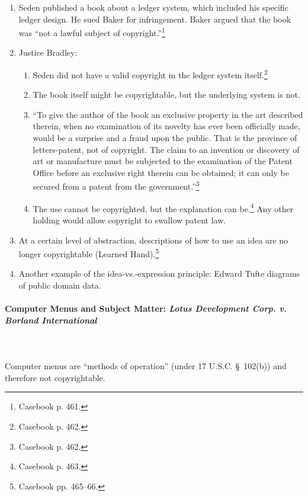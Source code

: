 \begin{enumerate}
    \item Seden published a book about a ledger system, which included his 
    specific ledger design. He sued Baker for infringement. Baker argued that 
    the book was ``not a lawful subject of copyright.''\footnote{Casebook p. 
    461.}
    \item Justice Bradley:
    \begin{enumerate}
        \item Seden did not have a valid copyright in the ledger system 
        itself.\footnote{Casebook p. 462.}
        \item The book itself might be copyrightable, but the underlying 
        system is not.
        \item ``To give the author of the book an exclusive property in the 
        art described therein, when no examination of its novelty has ever 
        been officially made, would be a surprise and a fraud upon the public. 
        That is the province of letters-patent, not of copyright. The claim to 
        an invention or discovery of art or manufacture must be subjected to 
        the examination of the Patent Office before an exclusive right therein 
        can be obtained; it can only be secured from a patent from the 
        government.''\footnote{Casebook p. 462.}
        \item The use cannot be copyrighted, but the explanation can 
        be.\footnote{Casebook p. 463.} Any other holding would allow copyright 
        to swallow patent law.
    \end{enumerate}
    \item At a certain level of abstraction, descriptions of how to use an 
    idea are no longer copyrightable (Learned Hand).\footnote{Casebook pp. 
    465--66.}
    \item Another example of the idea-vs.-expression principle: Edward Tufte 
    diagrams of public domain data.
\end{enumerate}

\paragraph{Computer Menus and Subject Matter: \emph{Lotus Development Corp. v. 
Borland International}}
~\\\\
Computer menus are ``methods of operation'' (under 17 U.S.C. \S\ 102(b)) and 
therefore not copyrightable.

